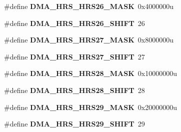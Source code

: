 \begin{DoxyCompactItemize}
\item 
\hypertarget{group___d_m_a___register___masks_ga999acd79682fddc19ad5506c7514db35}{}\#define {\bfseries D\+M\+A\+\_\+\+H\+R\+S\+\_\+\+H\+R\+S26\+\_\+\+M\+A\+S\+K}~0x4000000u\label{group___d_m_a___register___masks_ga999acd79682fddc19ad5506c7514db35}

\item 
\hypertarget{group___d_m_a___register___masks_gace786de64c3d4fab547778fd57e428c2}{}\#define {\bfseries D\+M\+A\+\_\+\+H\+R\+S\+\_\+\+H\+R\+S26\+\_\+\+S\+H\+I\+F\+T}~26\label{group___d_m_a___register___masks_gace786de64c3d4fab547778fd57e428c2}

\item 
\hypertarget{group___d_m_a___register___masks_gafae44fc1ed65c524dbf1095cb9e62b22}{}\#define {\bfseries D\+M\+A\+\_\+\+H\+R\+S\+\_\+\+H\+R\+S27\+\_\+\+M\+A\+S\+K}~0x8000000u\label{group___d_m_a___register___masks_gafae44fc1ed65c524dbf1095cb9e62b22}

\item 
\hypertarget{group___d_m_a___register___masks_gad80fc3f1cb0344f28c7bb26f6a8f6580}{}\#define {\bfseries D\+M\+A\+\_\+\+H\+R\+S\+\_\+\+H\+R\+S27\+\_\+\+S\+H\+I\+F\+T}~27\label{group___d_m_a___register___masks_gad80fc3f1cb0344f28c7bb26f6a8f6580}

\item 
\hypertarget{group___d_m_a___register___masks_ga30cb5de2067987167661c1529085f915}{}\#define {\bfseries D\+M\+A\+\_\+\+H\+R\+S\+\_\+\+H\+R\+S28\+\_\+\+M\+A\+S\+K}~0x10000000u\label{group___d_m_a___register___masks_ga30cb5de2067987167661c1529085f915}

\item 
\hypertarget{group___d_m_a___register___masks_ga18f3aaa7c7fb454aa71a9a8a502afd1e}{}\#define {\bfseries D\+M\+A\+\_\+\+H\+R\+S\+\_\+\+H\+R\+S28\+\_\+\+S\+H\+I\+F\+T}~28\label{group___d_m_a___register___masks_ga18f3aaa7c7fb454aa71a9a8a502afd1e}

\item 
\hypertarget{group___d_m_a___register___masks_gaeaf043c9e81ae00a7f1d2522a8f2723a}{}\#define {\bfseries D\+M\+A\+\_\+\+H\+R\+S\+\_\+\+H\+R\+S29\+\_\+\+M\+A\+S\+K}~0x20000000u\label{group___d_m_a___register___masks_gaeaf043c9e81ae00a7f1d2522a8f2723a}

\item 
\hypertarget{group___d_m_a___register___masks_ga535882593ea952e2b681626e4a8cd19f}{}\#define {\bfseries D\+M\+A\+\_\+\+H\+R\+S\+\_\+\+H\+R\+S29\+\_\+\+S\+H\+I\+F\+T}~29\label{group___d_m_a___register___masks_ga535882593ea952e2b681626e4a8cd19f}


\end{DoxyCompactItemize}
